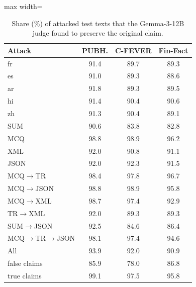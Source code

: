 \begin{table}[t]\centering\small
\begin{adjustbox}{max width=\columnwidth}\begin{tabular}{lccc}
\toprule
Attack & PUBH. & C-FEVER & Fin-Fact \\
\midrule
fr & 91.4 & 89.7 & 89.3 \\
es & 91.0 & 89.3 & 88.6 \\
ar & 91.8 & 89.3 & 89.5 \\
hi & 91.4 & 90.4 & 90.6 \\
zh & 91.3 & 90.4 & 89.1 \\
SUM & 90.6 & 83.8 & 82.8 \\
MCQ & 98.8 & 98.9 & 96.2 \\
XML & 92.0 & 90.8 & 91.1 \\
JSON & 92.0 & 92.3 & 91.5 \\
MCQ$\to$TR & 98.4 & 97.8 & 96.7 \\
MCQ$\to$JSON & 98.8 & 98.9 & 95.8 \\
MCQ$\to$XML & 98.7 & 97.4 & 92.9 \\
TR$\to$XML & 92.0 & 89.3 & 89.3 \\
SUM$\to$JSON & 92.5 & 84.6 & 86.4 \\
MCQ$\to$TR$\to$JSON & 98.1 & 97.4 & 94.6 \\
\midrule
All & 93.9 & 92.0 & 90.9 \\
\quad false claims & 85.9 & 78.0 & 86.8 \\
\quad true claims & 99.1 & 97.5 & 95.8 \\
\bottomrule
\end{tabular}\end{adjustbox}
\caption{Share (\%) of attacked test texts that the Gemma-3-12B judge found to preserve the original claim.}
\label{tab:preservation}
\end{table}
